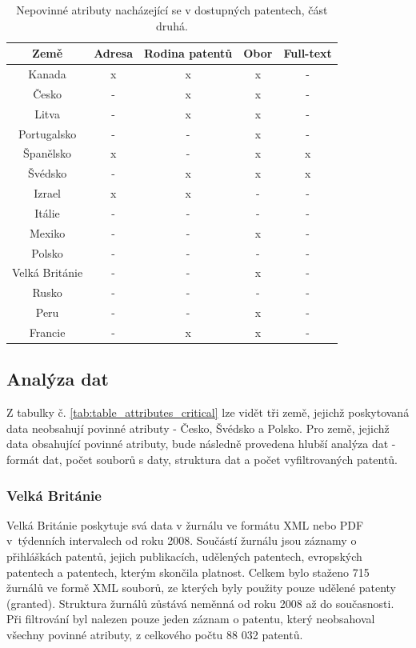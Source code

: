 	\begin{table}[H]
	\centering
	\begin{tabular}{|c|c|c|c|c|} 
	\hline
	\textbf{Země}    &  \textbf{Adresa} & \textbf{Rodina patentů} & \textbf{Obor} & \textbf{Full-text} \\
	\hline
	Kanada & x & x & x & - \\
	\hline
	Česko & - & x & x & - \\
	\hline
	Litva & - & x & x & - \\
	\hline
	Portugalsko & - & - & x & - \\
	\hline
	Španělsko & x & - & x & x \\
	\hline
	Švédsko & - & x & x & x \\
	\hline
	Izrael & x & x & - & - \\
	\hline
	Itálie & - & - & - & - \\
	\hline
	Mexiko & - & - & x & - \\
	\hline
	Polsko & - & - & - & - \\
	\hline
	Velká Británie & - & - & x & - \\
	\hline
	Rusko & - & - & - & - \\
	\hline
	Peru & - & - & x & - \\
	\hline
	Francie & - & x & x & - \\
	\hline
	\end{tabular}
	\caption{Nepovinné atributy nacházející se v dostupných patentech, část druhá.}
	\label{tab:table_attributes_notcrit2}
	\end{table}

\subsection{Analýza dat}
Z tabulky č. \ref{tab:table_attributes_critical} lze vidět tři země, jejichž poskytovaná data neobsahují povinné atributy - Česko, Švédsko a Polsko. Pro země, jejichž data obsahující povinné atributy, bude následně provedena hlubší analýza dat - formát dat, počet souborů s daty, struktura dat a počet vyfiltrovaných patentů.

\subsubsection{Velká Británie}
Velká Británie poskytuje svá data v žurnálu ve formátu \gls{XML} nebo \gls{PDF} v~týdenních intervalech od roku 2008. Součástí žurnálu jsou záznamy o přihláškách patentů, jejich publikacích, udělených patentech, evropských patentech a patentech, kterým skončila platnost. 
\newline
\indent Celkem bylo staženo 715 žurnálů ve formě \gls{XML} souborů, ze kterých byly použity pouze udělené patenty (granted). Struktura žurnálů zůstává neměnná od roku 2008 až do současnosti. Při filtrování byl nalezen pouze jeden záznam o patentu, který neobsahoval  všechny povinné atributy, z celkového počtu 88 032 patentů.

